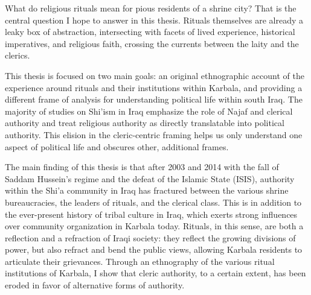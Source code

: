 
What do religious rituals mean for pious residents of a shrine city? That is the central question I hope to answer in this thesis. Rituals themselves are already a leaky box of abstraction, intersecting with facets of lived experience, historical imperatives, and religious faith, crossing the currents between the laity and the clerics.  


This thesis is focused on two main goals: an original ethnographic account of the experience around rituals and their institutions within Karbala, and providing a different frame of analysis for understanding political life within south Iraq. The majority of studies on Shi'ism in Iraq emphasize the role of Najaf and clerical authority and treat religious authority as directly translatable into political authority. This elision in the cleric-centric framing helps us only understand one aspect of political life and obscures other, additional frames. 

The main finding of this thesis is that after 2003 and 2014 with the fall of Saddam Hussein's regime and the defeat of the Islamic State (ISIS), authority within the Shi'a community in Iraq has fractured between the various shrine  bureaucracies, the leaders of rituals, and the clerical class. This is in addition to the ever-present history of tribal culture in Iraq, which exerts strong influences over community organization in Karbala today. Rituals, in this sense, are both a reflection and a refraction of Iraqi society: they reflect the growing divisions of power, but also refract and bend the public views, allowing Karbala residents to articulate their grievances. Through an ethnography of the various ritual institutions of Karbala, I show that cleric authority, to a certain extent, has been eroded in favor of alternative forms of authority. 

